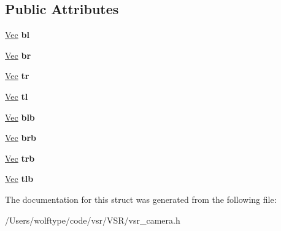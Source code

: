 \subsection*{Public Attributes}
\begin{DoxyCompactItemize}
\item 
\hypertarget{structvsr_1_1_volume_af62f17544e5f289a7a54f83095dd99da}{\hyperlink{namespacevsr_a0d061c30ac198a710a1b92dd8b343273}{Vec} {\bfseries bl}}\label{structvsr_1_1_volume_af62f17544e5f289a7a54f83095dd99da}

\item 
\hypertarget{structvsr_1_1_volume_a8570fdec522ff22c4419275cb1b3bb1f}{\hyperlink{namespacevsr_a0d061c30ac198a710a1b92dd8b343273}{Vec} {\bfseries br}}\label{structvsr_1_1_volume_a8570fdec522ff22c4419275cb1b3bb1f}

\item 
\hypertarget{structvsr_1_1_volume_a21969028f567fdd9b1fa7806881eb71c}{\hyperlink{namespacevsr_a0d061c30ac198a710a1b92dd8b343273}{Vec} {\bfseries tr}}\label{structvsr_1_1_volume_a21969028f567fdd9b1fa7806881eb71c}

\item 
\hypertarget{structvsr_1_1_volume_ad4f9c4842906bcfb636e04ec8ac5049e}{\hyperlink{namespacevsr_a0d061c30ac198a710a1b92dd8b343273}{Vec} {\bfseries tl}}\label{structvsr_1_1_volume_ad4f9c4842906bcfb636e04ec8ac5049e}

\item 
\hypertarget{structvsr_1_1_volume_adcf859f9b62f0fb2865337f26ac6a8b3}{\hyperlink{namespacevsr_a0d061c30ac198a710a1b92dd8b343273}{Vec} {\bfseries blb}}\label{structvsr_1_1_volume_adcf859f9b62f0fb2865337f26ac6a8b3}

\item 
\hypertarget{structvsr_1_1_volume_a870642021ac0bbb8a29f9f2565d6cce2}{\hyperlink{namespacevsr_a0d061c30ac198a710a1b92dd8b343273}{Vec} {\bfseries brb}}\label{structvsr_1_1_volume_a870642021ac0bbb8a29f9f2565d6cce2}

\item 
\hypertarget{structvsr_1_1_volume_ac89b8525ed9f104bab9aaff8902f51db}{\hyperlink{namespacevsr_a0d061c30ac198a710a1b92dd8b343273}{Vec} {\bfseries trb}}\label{structvsr_1_1_volume_ac89b8525ed9f104bab9aaff8902f51db}

\item 
\hypertarget{structvsr_1_1_volume_a1120484922a148b112f37929582449ed}{\hyperlink{namespacevsr_a0d061c30ac198a710a1b92dd8b343273}{Vec} {\bfseries tlb}}\label{structvsr_1_1_volume_a1120484922a148b112f37929582449ed}

\end{DoxyCompactItemize}


The documentation for this struct was generated from the following file\-:\begin{DoxyCompactItemize}
\item 
/\-Users/wolftype/code/vsr/\-V\-S\-R/vsr\-\_\-camera.\-h\end{DoxyCompactItemize}
